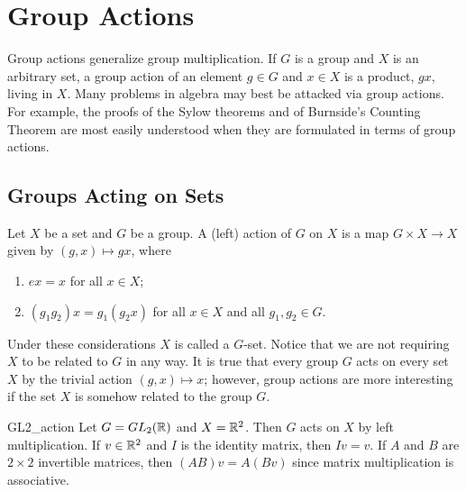 \chapter{Group Actions}\label{actions}

Group actions generalize group multiplication.  If $G$ is a group and $X$ is an arbitrary set, a group action of an element $g \in G$ and $x \in X$ is a product, $gx$,  living in $X$.  Many problems in algebra may best be attacked via group actions.  For example, the proofs of the Sylow theorems and of Burnside's Counting Theorem are most easily understood when they are formulated in terms of group actions. 


\section{Groups Acting on Sets}

Let $X$ be a set and $G$ be a group.  A  {\bfi (left) action\/} of $G$ on $X$ is a map $G \times X \rightarrow X$ given by $(g,x) \mapsto gx$, where 
\begin{enumerate}
 
\item 
$ex = x$ for all $x \in X$;
 
\item 
$(g_1 g_2)x = g_1(g_2 x)$ for all $x \in X$ and all $g_1, g_2 \in G$. 
 
\end{enumerate}
Under these considerations $X$ is called a {\bfi $G$-set}.  Notice that we are not requiring $X$ to be related to $G$ in any way.  It is true that every group $G$ acts on every set $X$ by the trivial action $(g,x) \mapsto x$; however, group actions are more interesting if the set $X$ is somehow related to the group $G$. 

\begin{example}{GL2_action}
Let $G = GL_2( {\Bbb R} )$ and $X = {\Bbb R}^2$. Then $G$ acts on $X$ by left multiplication.  If $v \in {\Bbb R}^2$ and $I$ is the identity matrix, then $Iv = v$.  If $A$ and $B$ are $2 \times 2$ invertible matrices, then $(AB)v = A(Bv)$ since matrix multiplication is
associative. 
\end{example}

